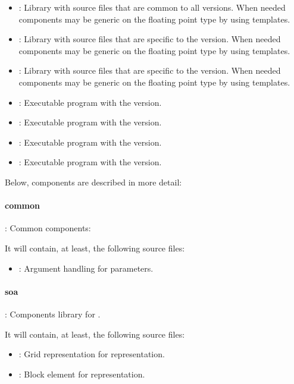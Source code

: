 \begin{itemize}
  \item {}: 
        Library with source files that are common to all versions.
        When needed components may be generic on the floating point type by using
        templates.

  \item {}: 
        Library with source files that are specific to the  version.
        When needed components may be generic on the floating point type by using
        templates.

  \item {}:
        Library with source files that are specific to the  version.
        When needed components may be generic on the floating point type by using
        templates.

  \item {}: 
        Executable program with the  version.

  \item {}: 
        Executable program with the  version.

  \item {}: 
        Executable program with the  version.

  \item {}: 
        Executable program with the  version.


\end{itemize}

Below, components are described in more detail:

\paragraph{common}: Common components:

It will contain, at least, the following source files:
\begin{itemize}
  \item {}: 
        Argument handling for  parameters. 
\end{itemize}

\paragraph{soa}: Components library for .

It will contain, at least, the following source files:
\begin{itemize}
  \item {}: 
        Grid representation for  representation.
  \item {}: 
        Block element for  representation.
\end{itemize}

